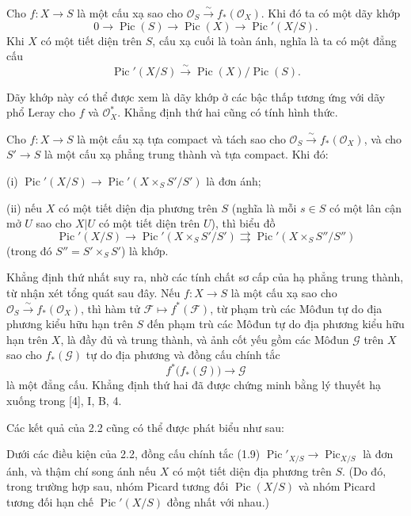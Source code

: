  Cho $f:X\longrightarrow S$ là một cấu xạ sao cho
$\mathcal O_S\xrightarrow{\sim}f_*(\mathcal O_X)$. Khi đó ta có một dãy khớp
\[
0\longrightarrow\operatorname{Pic}(S)\longrightarrow\operatorname{Pic}(X)
\longrightarrow\operatorname{Pic}'(X/S).
\]
Khi $X$ có một tiết diện trên $S$, cấu xạ cuối là toàn ánh, nghĩa là ta có một
đẳng cấu
\[
\operatorname{Pic}'(X/S)\xrightarrow{\sim}
\operatorname{Pic}(X)/\operatorname{Pic}(S).
\]

Dãy khớp này có thể được xem là dãy khớp ở các bậc thấp tương ứng với dãy phổ
Leray cho $f$ và $\mathcal O_X^*$. Khẳng định thứ hai cũng có tính hình thức.

 Cho $f:X\longrightarrow S$ là một cấu xạ tựa compact và
tách sao cho $\mathcal O_S\xrightarrow{\sim}f_*(\mathcal O_X)$, và cho
$S'\longrightarrow S$ là một cấu xạ phẳng trung thành và tựa compact. Khi đó:

\noindent (i) $\operatorname{Pic}'(X/S)\longrightarrow
\operatorname{Pic}'(X\times_SS'/S')$ là đơn ánh;

\noindent (ii) nếu $X$ có một tiết diện địa phương trên $S$ (nghĩa là mỗi
$s\in S$ có một lân cận mở $U$ sao cho $X|U$ có một tiết diện trên $U$), thì
biểu đồ
\[
\operatorname{Pic}'(X/S)\longrightarrow
\operatorname{Pic}'(X\times_SS'/S')\rightrightarrows
\operatorname{Pic}'(X\times_SS''/S'')
\]
(trong đó $S''=S'\times_SS'$) là khớp.

Khẳng định thứ nhất suy ra, nhờ các tính chất sơ cấp của hạ phẳng trung thành,
từ nhận xét tổng quát sau đây. Nếu $f:X\longrightarrow S$ là một cấu xạ sao cho
$\mathcal O_S\xrightarrow{\sim}f_*(\mathcal O_X)$, thì hàm tử
$\mathcal F\longmapsto f^*(\mathcal F)$, từ phạm trù các Môđun tự do địa
phương kiểu hữu hạn trên $S$ đến phạm trù các Môđun tự do địa phương kiểu hữu
hạn trên $X$, là đầy đủ và trung thành, và ảnh cốt yếu gồm các Môđun
$\mathcal G$ trên $X$ sao cho $f_*(\mathcal G)$ tự do địa phương và đồng cấu
chính tắc
\[
f^*\bigl(f_*(\mathcal G)\bigr)\longrightarrow\mathcal G
\]
là một đẳng cấu. Khẳng định thứ hai đã được chứng minh bằng lý thuyết hạ xuống
trong [4], I, B, 4.

Các kết quả của 2.2 cũng có thể được phát biểu như sau:

 Dưới các điều kiện của 2.2, đồng cấu chính tắc
(1.9) $\operatorname{Pic}'_{X/S}\longrightarrow\operatorname{Pic}_{X/S}$ là
đơn ánh, và thậm chí song ánh nếu $X$ có một tiết diện địa phương trên $S$.
(Do đó, trong trường hợp sau, nhóm Picard tương đối
$\operatorname{Pic}(X/S)$ và nhóm Picard tương đối hạn chế
$\operatorname{Pic}'(X/S)$ đồng nhất với nhau.)

